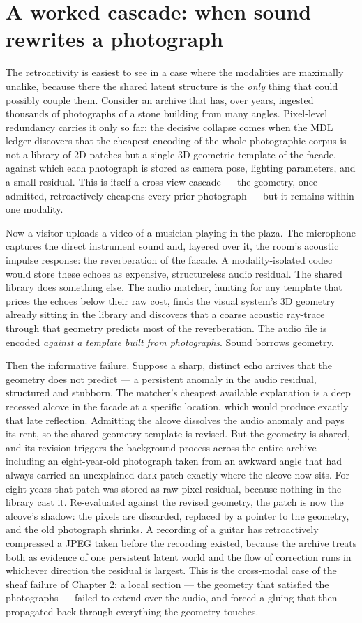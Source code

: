 \documentclass[11pt,oneside]{book}
\theoremstyle{remark}
\begin{document}
\section{A worked cascade: when sound rewrites a photograph}

The retroactivity is easiest to see in a case where the modalities are
maximally unalike, because there the shared latent structure is the
\emph{only} thing that could possibly couple them. Consider an archive
that has, over years, ingested thousands of photographs of a stone
building from many angles. Pixel-level redundancy carries it only so
far; the decisive collapse comes when the MDL ledger discovers that the
cheapest encoding of the whole photographic corpus is not a library of
2D patches but a single 3D geometric template of the facade, against
which each photograph is stored as camera pose, lighting parameters,
and a small residual. This is itself a cross-view cascade --- the
geometry, once admitted, retroactively cheapens every prior photograph
--- but it remains within one modality.

Now a visitor uploads a video of a musician playing in the plaza. The
microphone captures the direct instrument sound and, layered over it,
the room's acoustic impulse response: the reverberation of the facade.
A modality-isolated codec would store these echoes as expensive,
structureless audio residual. The shared library does something else.
The audio matcher, hunting for any template that prices the echoes
below their raw cost, finds the visual system's 3D geometry already
sitting in the library and discovers that a coarse acoustic ray-trace
through that geometry predicts most of the reverberation. The audio
file is encoded \emph{against a template built from photographs}. Sound
borrows geometry.

Then the informative failure. Suppose a sharp, distinct echo arrives
that the geometry does not predict --- a persistent anomaly in the
audio residual, structured and stubborn. The matcher's cheapest
available explanation is a deep recessed alcove in the facade at a
specific location, which would produce exactly that late reflection.
Admitting the alcove dissolves the audio anomaly and pays its rent, so
the shared geometry template is revised. But the geometry is shared,
and its revision triggers the background process across the entire
archive --- including an eight-year-old photograph taken from an awkward
angle that had always carried an unexplained dark patch exactly where
the alcove now sits. For eight years that patch was stored as raw pixel
residual, because nothing in the library cast it. Re-evaluated against
the revised geometry, the patch is now the alcove's shadow: the pixels
are discarded, replaced by a pointer to the geometry, and the old
photograph shrinks. A recording of a guitar has retroactively
compressed a JPEG taken before the recording existed, because the
archive treats both as evidence of one persistent latent world and the
flow of correction runs in whichever direction the residual is largest.
This is the cross-modal case of the sheaf failure of Chapter 2: a local
section --- the geometry that satisfied the photographs --- failed to
extend over the audio, and forced a gluing that then propagated back
through everything the geometry touches.
\end{document}
